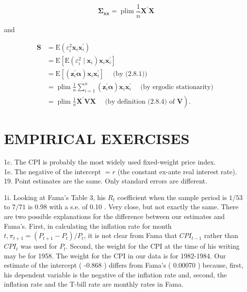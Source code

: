 \documentclass[10pt]{article}
\begin{document}
$$
\boldsymbol{\Sigma}_{\mathbf{x x}}=\operatorname{plim} \frac{1}{n} \mathbf{X}^{\prime} \mathbf{X}
$$

and

$$
\begin{aligned}
\mathbf{S} & =\mathrm{E}\left(\varepsilon_{i}^{2} \mathbf{x}_{i} \mathbf{x}_{i}^{\prime}\right) \\
& =\mathrm{E}\left[\mathrm{E}\left(\varepsilon_{i}^{2} \mid \mathbf{x}_{i}\right) \mathbf{x}_{i} \mathbf{x}_{i}^{\prime}\right] \\
& =\mathrm{E}\left[\left(\mathbf{z}_{i}^{\prime} \boldsymbol{\alpha}\right) \mathbf{x}_{i} \mathbf{x}_{i}^{\prime}\right] \quad \text { (by (2.8.1)) } \\
& =\operatorname{plim} \frac{1}{n} \sum_{i=1}^{n}\left(\mathbf{z}_{i}^{\prime} \boldsymbol{\alpha}\right) \mathbf{x}_{i} \mathbf{x}_{i}^{\prime} \quad \text { (by ergodic stationarity) } \\
& \left.=\operatorname{plim} \frac{1}{n} \mathbf{X}^{\prime} \mathbf{V} \mathbf{X} \quad \text { (by definition (2.8.4) of } \mathbf{V}\right) .
\end{aligned}
$$

\section*{EMPIRICAL EXERCISES}
1c. The CPI is probably the most widely used fixed-weight price index.\\
1e. The negative of the intercept $=r$ (the constant ex-ante real interest rate).\\
19. Point estimates are the same. Only standard errors are different.

1i. Looking at Fama's Table 3, his $R_{t}$ coefficient when the sample period is $1 / 53$ to $7 / 71$ is 0.98 with a s.e. of 0.10 . Very close, but not exactly the same. There are two possible explanations for the difference between our estimates and Fama's. First, in calculating the inflation rate for month $t, \pi_{t+1}=\left(P_{t+1}-P_{t}\right) / P_{t}$, it is not clear from Fama that $C P I_{t-1}$ rather than $C P I_{t}$ was used for $P_{t}$. Second, the weight for the CPI at the time of his writing may be for 1958. The weight for the CPI in our data is for 1982-1984. Our estimate of the intercept ( -0.868 ) differs from Fama's ( 0.00070 ) because, first, his dependent variable is the negative of the inflation rate and, second, the inflation rate and the T-bill rate are monthly rates in Fama.
\end{document}
